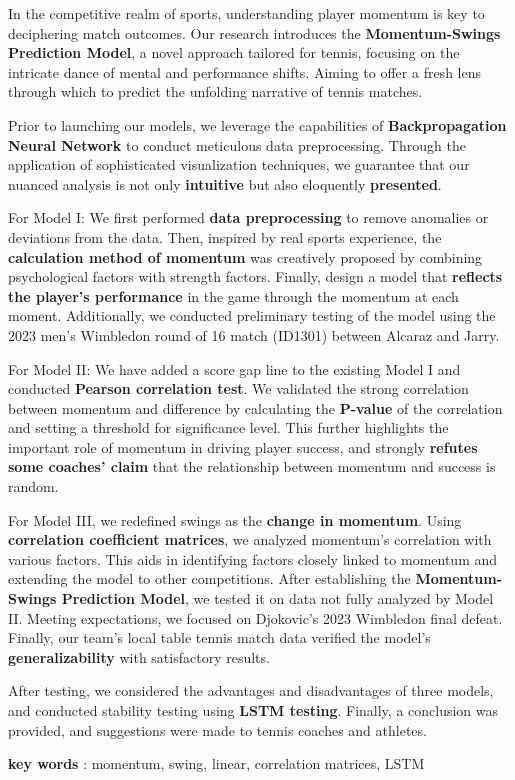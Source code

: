 \documentclass[13pt]{ctexart}
\begin{document}
\begin{adjustwidth}{1cm}{1cm}
\indent { }{ }{ }{ }{ }{ }In the competitive realm of sports, understanding player momentum is key to deciphering match outcomes. Our research introduces the \textbf{Momentum-Swings Prediction Model}, a novel approach tailored for tennis, focusing on the intricate dance of mental and performance shifts. Aiming to offer a fresh lens through which to predict the unfolding narrative of tennis matches.

Prior to launching our models, we leverage the capabilities of \textbf{Backpropagation Neural Network} to conduct meticulous data preprocessing. Through the application of sophisticated visualization techniques, we guarantee that our nuanced analysis is not only \textbf{intuitive} but also eloquently \textbf{presented}.

For Model I: We first performed \textbf{data preprocessing} to remove anomalies or deviations from the data. Then, inspired by real sports experience, the \textbf{calculation method of momentum} was creatively proposed by combining psychological factors with strength factors. Finally, design a model that \textbf{reflects the player's performance} in the game through the momentum at each moment. Additionally, we conducted preliminary testing of the model using the 2023 men's Wimbledon round of 16 match (ID1301) between Alcaraz and Jarry.

For Model II: We have added a score gap line to the existing Model I and conducted \textbf{Pearson correlation test}. We validated the strong correlation between momentum and difference by calculating the \textbf{P-value} of the correlation and setting a threshold for significance level. This further highlights the important role of momentum in driving player success, and strongly \textbf{refutes some coaches' claim} that the relationship between momentum and success is random.

For Model III, we redefined swings as the \textbf{change in momentum}. Using \textbf{correlation coefficient matrices}, we analyzed momentum's correlation with various factors. This aids in identifying factors closely linked to momentum and extending the model to other competitions. After establishing the \textbf{Momentum-Swings Prediction Model}, we tested it on data not fully analyzed by Model II. Meeting expectations, we focused on Djokovic's 2023 Wimbledon final defeat. Finally, our team's local table tennis match data verified the model's \textbf{generalizability} with satisfactory results.

After testing, we considered the advantages and disadvantages of three models, and conducted stability testing using \textbf{LSTM testing}. Finally, a conclusion was provided, and suggestions were made to tennis coaches and athletes.

\vspace{15pt}
\textbf{key words} : momentum, swing, linear, correlation matrices, LSTM
\end{adjustwidth} 
\end{document}
